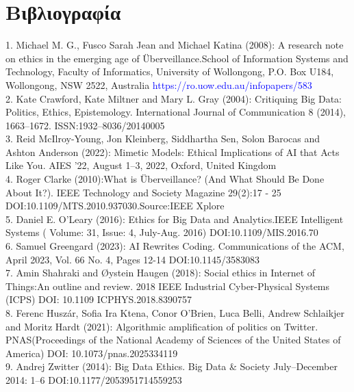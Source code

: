 \documentclass[conference]{IEEEtran}
\newcommand{\en}{\selectlanguage{english}}
\newcommand{\gr}{\selectlanguage{greek}}
\begin{document}
\gr \section*{\fontsize{17}{20}\selectfont Βιβλιογραφία}

\en 1. Michael M. G., Fusco Sarah Jean and Michael Katina (2008): A research note on ethics in the emerging age of Überveillance.School of Information Systems and Technology, Faculty of Informatics, University of Wollongong, P.O. Box U184, Wollongong, NSW 2522, Australia
\textcolor{blue}{https://ro.uow.edu.au/infopapers/583} \\ 

2. Kate Crawford, Kate Miltner and Mary L. Gray (2004): Critiquing Big Data: Politics, Ethics, Epistemology. International Journal of Communication 8 (2014), 1663–1672. ISSN:1932–8036/20140005 \\

3. Reid McIlroy-Young, Jon Kleinberg, Siddhartha Sen, Solon Barocas and Ashton Anderson (2022): Mimetic Models: Ethical Implications of AI that Acts Like You. AIES ’22, August 1–3, 2022, Oxford, United Kingdom \\

4. Roger Clarke (2010):What is Überveillance? (And What Should Be Done About It?). IEEE Technology and Society Magazine 29(2):17 - 25 DOI:10.1109/MTS.2010.937030.Source:IEEE Xplore \\

5. Daniel E. O’Leary (2016): Ethics for Big Data and Analytics.IEEE Intelligent Systems ( Volume: 31, Issue: 4, July-Aug. 2016) DOI:10.1109/MIS.2016.70 \\

6. Samuel Greengard (2023): AI Rewrites Coding. Communications of the ACM, April 2023, Vol. 66 No. 4, Pages 12-14 DOI:10.1145/3583083 \\

7. Amin Shahraki and Øystein Haugen (2018): Social ethics in Internet of Things:An outline and review. 2018 IEEE Industrial Cyber-Physical Systems (ICPS) DOI: 10.1109 ICPHYS.2018.8390757 \\

8. Ferenc Huszár, Sofia Ira Ktena, Conor O’Brien, Luca Belli, Andrew Schlaikjer and Moritz Hardt (2021): Algorithmic amplification of politics on Twitter. PNAS(Proceedings of the National Academy of Sciences of the United States of America) DOI: 10.1073/pnas.2025334119 \\ 
9. Andrej Zwitter (2014): Big Data Ethics. Big Data \& Society July–December 2014: 1–6 DOI:10.1177/2053951714559253 \\
\end{document}
